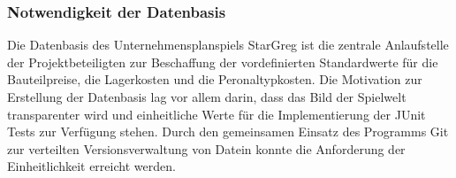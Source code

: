 \subsubsection{Notwendigkeit der Datenbasis}
\label{subsub:spielwelt-datenbasis-einleitung-notwendigkeit}


Die Datenbasis des Unternehmensplanspiels StarGreg ist die zentrale Anlaufstelle der Projektbeteiligten zur Beschaffung der vordefinierten Standardwerte für die Bauteilpreise, die Lagerkosten und die Peronaltypkosten. Die Motivation zur Erstellung der Datenbasis lag vor allem darin, dass das Bild der Spielwelt transparenter wird und einheitliche Werte für die Implementierung der JUnit Tests zur Verfügung stehen. Durch den gemeinsamen Einsatz des Programms Git zur verteilten Versionsverwaltung von Datein konnte die Anforderung der Einheitlichkeit erreicht werden. 
